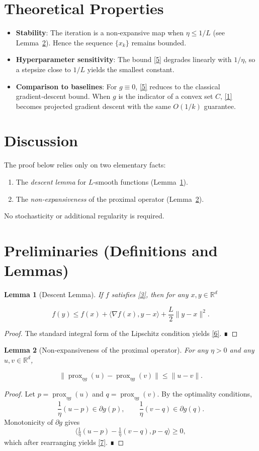 \documentclass{article}
\newtheorem{lemma}{Lemma}
\newcommand{\prox}{\operatorname{prox}}
\newcommand{\R}{\mathbb{R}}
\begin{document}
\section*{Theoretical Properties}
\begin{itemize}
  \item \textbf{Stability}: The iteration is a non‑expansive map when $\eta\le1/L$ (see Lemma~\ref{lem:nonexpansive}). Hence the sequence $\{x_{k}\}$ remains bounded.
  \item \textbf{Hyperparameter sensitivity}: The bound \eqref{5} degrades linearly with $1/\eta$, so a stepsize close to $1/L$ yields the smallest constant.
  \item \textbf{Comparison to baselines}: For $g\equiv0$, \eqref{5} reduces to the classical gradient‑descent bound. When $g$ is the indicator of a convex set $C$, \eqref{1} becomes projected gradient descent with the same $O(1/k)$ guarantee.
\end{itemize}

\section*{Discussion}
The proof below relies only on two elementary facts:
\begin{enumerate}
  \item The \emph{descent lemma} for $L$‑smooth functions (Lemma~\ref{lem:descent}).
  \item The \emph{non‑expansiveness} of the proximal operator (Lemma~\ref{lem:nonexpansive}).
\end{enumerate}
No stochasticity or additional regularity is required.

\newpage
\section*{Preliminaries (Definitions and Lemmas)}
\begin{lemma}[Descent Lemma]\label{lem:descent}
If $f$ satisfies \eqref{3}, then for any $x,y\in\R^{d}$  

\[
f(y)\le f(x)+\langle\nabla f(x),y-x\rangle+\frac{L}{2}\|y-x\|^{2}.
\tag{6}
\]
\end{lemma}
\begin{proof}
The standard integral form of the Lipschitz condition yields \eqref{6}. ∎
\end{proof}

\begin{lemma}[Non‑expansiveness of the proximal operator]\label{lem:nonexpansive}
For any $\eta>0$ and any $u,v\in\R^{d}$,  

\[
\bigl\|\prox_{\eta g}(u)-\prox_{\eta g}(v)\bigr\|\le \|u-v\|.
\tag{7}
\]
\end{lemma}
\begin{proof}
Let $p=\prox_{\eta g}(u)$ and $q=\prox_{\eta g}(v)$. By the optimality conditions,
\[
\frac{1}{\eta}(u-p)\in\partial g(p),\qquad 
\frac{1}{\eta}(v-q)\in\partial g(q).
\]
Monotonicity of $\partial g$ gives
\[
\big\langle \tfrac{1}{\eta}(u-p)-\tfrac{1}{\eta}(v-q),p-q\big\rangle\ge0,
\]
which after rearranging yields \eqref{7}. ∎
\end{proof}
\end{document}
